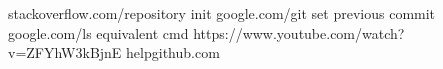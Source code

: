 \begin{thebibliography}{99999}
\singlespace\normalsize


 stackoverflow.com/repository init
 google.com/git set previous commit 
 google.com/ls equivalent cmd
 https://www.youtube.com/watch?v=ZFYhW3kBjnE
 helpgithub.com



\end{thebibliography}
